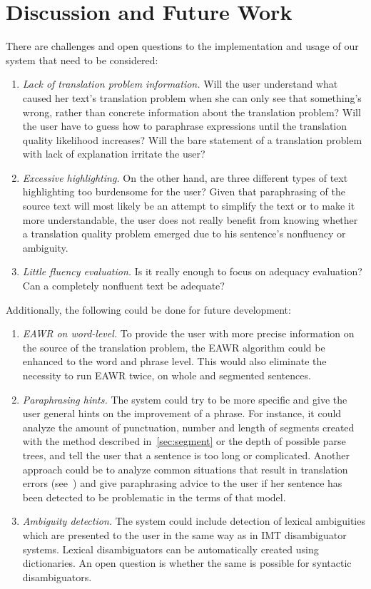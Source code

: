 \documentclass[hidelinks,10pt,letter]{article} %
\begin{document}
    \section{Discussion and Future Work}\label{sec:discuss}
    There are challenges and open questions to the implementation and usage of our system that need to be considered:
    \begin{enumerate}
        \item \textit{Lack of translation problem information.} Will the user understand what caused her text's translation problem when she can only see that something's wrong, rather than concrete
            information about the translation problem? Will the user have to guess how to paraphrase expressions until the translation quality likelihood
            increases? Will the bare statement of a translation problem with lack of explanation irritate the user?
        \item \textit{Excessive highlighting.} On the other hand, are three different types of text highlighting too burdensome for the user? Given that paraphrasing
            of the source text will most likely be an attempt to simplify the text or to make it more understandable, the user does not really
            benefit from knowing whether a translation quality problem emerged due to his sentence's nonfluency or ambiguity.
        \item \textit{Little fluency evaluation.} Is it really enough to focus on adequacy evaluation? Can a completely nonfluent text be adequate? 
    \end{enumerate}
        
    Additionally, the following could be done for future development:
    \begin{enumerate}
        \item \textit{EAWR on word-level.} To provide the user with more precise information on the source of the translation problem, the EAWR algorithm could
            be enhanced to the word and phrase level. This would also eliminate the necessity to run EAWR twice, on whole and segmented sentences.
        \item \textit{Paraphrasing hints.} The system could try to be more specific and give the user general hints on the improvement of a phrase. 
            For instance, it could analyze the amount of punctuation,
            number and length of segments created with the method described in~\ref{sec:segment} or the depth of possible parse trees, and tell the user
            that a sentence is too long or complicated. Another approach could be to analyze common situations that result in translation errors (see~\cite{xiong2010error})
            and give paraphrasing advice to the user if her sentence has been detected to be problematic in the terms of that model.
        \item \textit{Ambiguity detection.} The system could include detection of lexical ambiguities which are presented to the user in the same way
            as in IMT disambiguator systems. Lexical disambiguators can be automatically created using dictionaries. An open question is 
            whether the same is possible for syntactic disambiguators.
    \end{enumerate}
\end{document}
